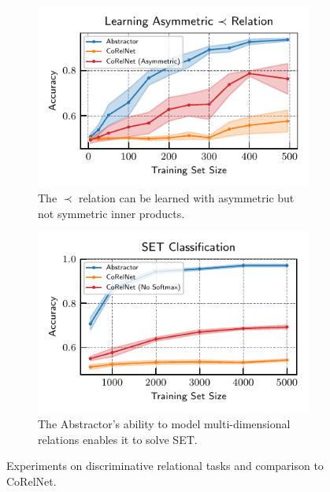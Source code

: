 \begin{figure}[t]
    \centering
    \begin{subfigure}[t]{0.45\textwidth}
        \centering
        \vskip-20pt
        \includegraphics[width=\textwidth]{figures/experiments/pairwise_order_learning_curves.pdf}
        \vskip-5pt
        \caption{The $\prec$ relation can be learned with asymmetric but not symmetric inner products.}\label{fig:exp_order_relation}
    \end{subfigure} 
    \hskip10pt
    \begin{subfigure}[t]{0.45\textwidth}
        \centering
        \vskip-20pt
        \includegraphics[width=\textwidth]{figures/experiments/set_classification.pdf}
        \vskip-5pt
        \caption{The Abstractor's ability to model multi-dimensional relations enables it to solve SET.}\label{fig:exp_set_classification}
    \end{subfigure}
    \caption{Experiments on discriminative relational tasks and comparison to CoRelNet.}
    \vskip-15pt
\end{figure}
